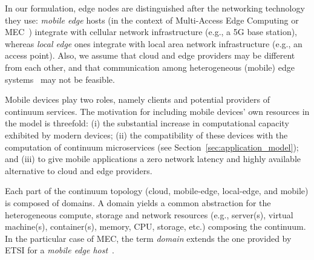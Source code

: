 %
%

In our formulation, edge nodes are distinguished after the networking technology they use: \textit{mobile edge} hosts (in the context of Multi-Access Edge Computing or MEC~\cite{etsimec16,ahmed2016isco}) integrate with cellular network infrastructure (e.g., a 5G base station), whereas \textit{local edge} ones integrate with local area network infrastructure (e.g., an access point). Also, we assume that cloud and edge providers may be different from each other, and that communication among heterogeneous (mobile) edge systems~\cite{etsimec16} may not be feasible.%


Mobile devices play two roles, namely clients and potential providers of continuum services. The motivation for including mobile devices' own  resources in the model is threefold: (i) the substantial increase in computational capacity exhibited by modern devices; (ii) the compatibility of these devices with the computation of continuum microservices (see Section~\ref{sec:application_model}); and (iii) to give mobile applications a zero network latency and highly available alternative to cloud and edge providers. 

Each part of the continuum topology (cloud, mobile-edge, local-edge, and mobile) is composed of domains.
A domain yields a common  abstraction for the heterogeneous compute, storage and network resources (e.g., server(s), virtual machine(s), container(s), memory, CPU, storage, etc.) composing the continuum. In the particular case of MEC, the term \textit{domain} extends the one provided by ETSI for a \textit{mobile edge host}~\cite{etsimec16}.



